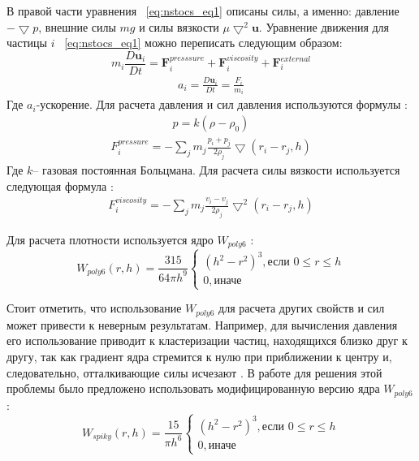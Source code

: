 В правой части уравнения ~\ref{eq:nstocs_eq1} описаны силы, а именно: давление \(-\bigtriangledown p\), внешние силы \(mg\) и силы вязкости \( \mu \bigtriangledown^{2}\mathbf{u} \). Уравнение движения для частицы \(i\) ~\ref{eq:nstocs_eq1} можно переписать следующим образом:
\begin{equation}
  \label{eq:common_disk}
  m_i\frac{D\mathbf{u}_i}{Dt}=\mathbf{F}_i^{presssure} + \mathbf{F}_i^{viscosity} + \mathbf{F}_i^{external}
\end{equation}
\begin{align}
  a_i=\frac{D\mathbf{u}_i}{Dt}=\frac{F_i}{m_i} \nonumber
\end{align}
Где \(a_i\)-ускорение. Для расчета давления и сил давления используются формулы \cite {Müller2003}:
\begin{align}
  p=k(\rho - \rho_0) \nonumber
\end{align}
\begin{align}
  F_{i}^{pressure}=-\sum_{j}m_j\frac{p_i+p_j}{2 \rho_j}\bigtriangledown(r_i-r_j, h) \nonumber
\end{align}
Где \(k\)– газовая постоянная Больцмана. Для расчета силы вязкости используется следующая формула \cite {Müller2003}:
\begin{align}
  F_{i}^{viscosity}=-\sum_{j}m_j\frac{v_i-v_j}{2 \rho_j}\bigtriangledown^{2}(r_i-r_j, h) \nonumber
\end{align}

Для расчета плотности используется ядро \(W_{poly6}\) \cite {Müller2003}:
\[
  W_{poly6}(r,h)= \frac{315}{64\pi h^{9}}
  \begin{cases}
    (h^{2}-r^{2})^{3}, \text{если } 0 \leqslant r \leqslant  h \\
    0, \text{иначе}
  \end{cases}
\]

Стоит отметить, что использование \(W_{poly6}\) для расчета других свойств и сил может привести к неверным результатам. Например, для вычисления давления его использование приводит к кластеризации частиц, находящихся близко друг к другу, так как градиент ядра стремится к нулю при  приближении к центру и, следовательно, отталкивающие силы исчезают \cite {Müller2003}. В работе \cite {Desbrun1996} для решения этой проблемы было предложено использовать модифицированную версию ядра \(W_{poly6}\):
\[
  W_{spiky}(r,h)= \frac{15}{\pi h^{6}}
  \begin{cases}
    (h^{2}-r^{2})^{3}, \text{если } 0 \leqslant r \leqslant  h \\
    0, \text{иначе}
  \end{cases}
\]

